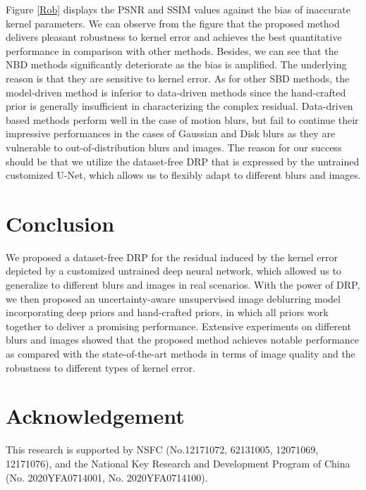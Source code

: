 \documentclass[10pt,twocolumn,letterpaper]{article}
\begin{document}
	Figure \ref{Rob} displays the PSNR and SSIM values against the bias of inaccurate kernel parameters. We can observe from the figure that the proposed method delivers pleasant robustness to kernel error and achieves the best quantitative performance in comparison with other methods. Besides, we can see that the NBD methods \cite{krishnan2009fast,ren2015fast} significantly deteriorate as the bias is amplified. The underlying reason is that they are sensitive to kernel error. As for other SBD methods,  the model-driven method \cite{ji2011robust} is inferior to data-driven methods \cite{vasu2018non,nan2020deep} since the hand-crafted prior is generally insufficient in characterizing the complex residual. Data-driven based methods perform well in the case of motion blurs, but fail to continue their impressive performances in the cases of Gaussian and Disk blurs as they are vulnerable to out-of-distribution blurs and images. The reason for our success should be that we utilize  the dataset-free DRP that is expressed by the untrained customized U-Net, which allows us to flexibly adapt to different blurs and images.
	
	\section{Conclusion}
	We proposed a dataset-free DRP for the residual induced by the kernel error depicted by a customized untrained deep neural network, which allowed us to generalize to different blurs and images in real scenarios. With the power of DRP, we then proposed an uncertainty-aware unsupervised image deblurring model  incorporating deep priors and hand-crafted priors, in which all priors work together to deliver a promising performance.  Extensive experiments on different blurs and images showed that the proposed method achieves notable performance as compared with the state-of-the-art methods in terms of image quality and the robustness to different types of kernel error.
	
	\section*{Acknowledgement}
	This research is supported by NSFC (No.12171072, 62131005, 12071069, 12171076), and the National Key Research and Development Program of China (No. 2020YFA0714001, No. 2020YFA0714100).
	
	{\small
		
		
	}
	
\end{document}
